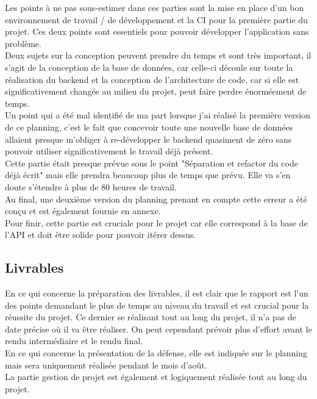 \documentclass[
    iai, %
    il, %
]{heig-tb}
\begin{document}
Les points à ne pas sous-estimer dans ces parties sont la mise en place d'un bon environnement de travail / de développement et la CI pour la première partie du projet. Ces deux points sont essentiels pour pouvoir développer l'application sans problème.\\
Deux sujets sur la conception peuvent prendre du temps et sont très important, il s'agit de la conception de la base de données, car celle-ci découle sur toute la réalisation du backend et la conception de l'architecture de code, car si elle est significativement changée au milieu du projet, peut faire perdre énorméement de temps.\\
Un point qui a été mal identifié de ma part lorsque j'ai réalisé la première version de ce planning,
c'est le fait que concevoir toute une nouvelle base de données allaient presque m'obliger à
re-développer le backend quasiment de zéro sans pouvoir utiliser significativement le travail déjà
présent.\\
Cette partie était presque prévue sous le point "Séparation et refactor du code déjà écrit" mais
elle prendra beaucoup plus de temps que prévu. Elle va s'en doute s'étendre à plus de 80 heures de
travail.\\
Au final, une deuxième version du planning prenant en compte cette erreur a été conçu et est également fournie en annexe.\\
Pour finir, cette partie est cruciale pour le projet car elle correspond à la base de l'API et doit être solide pour pouvoir itérer dessus.

\subsection{Livrables}
En ce qui concerne la préparation des livrables, il est clair que le rapport est l'un des points
demandant le plus de temps au niveau du travail et est crucial pour la réussite du projet. Ce
dernier se réalisant tout au long du projet, il n'a pas de date précise où il va être réaliser. On
peut cependant prévoir plus d'effort avant le rendu intermédiaire et le rendu final.\\
En ce qui concerne la présentation de la défense, elle est indiquée sur le planning mais sera uniquement réalisée pendant le mois d'août.\\
La partie gestion de projet est également et logiquement réalisée tout au long du projet.

\end{document}
